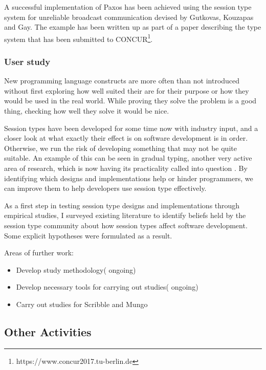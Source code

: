 A successful implementation of Paxos has been achieved using the session type system for unreliable broadcast communication devised by Gutkovas, Kouzapas and Gay. The example has been written up as part of a paper describing the type system that has been submitted to CONCUR\footnote{https://www.concur2017.tu-berlin.de}.

\subsubsection{User study}
\label{us}

New programming language constructs are more often than not introduced without first exploring how well suited their are for their purpose or how they would be used in the real world. While proving they solve the problem is a good thing, checking how well they solve it would be nice.

Session types have been developed for some time now with industry input, and a closer look at what exactly their effect is on software development is in order. Otherwise, we run the risk of developing something that may not be quite suitable. An example of this can be seen in gradual typing, another very active area of research, which is now having its practicality called into question \cite{Takikawa:2016:SGT:2837614.2837630}. By identifying which designs and implementations help or hinder programmers, we can improve them to help developers use session type effectively.


As a first step in testing session type designs and implementations through empirical studies, I surveyed existing literature to identify beliefs held by the session type community about how session types affect software development. Some explicit hypotheses were formulated as a result.\cite{Voinea:2016:BST:3001878.3001883}

Areas of further work:
\begin{itemize}
\item Develop study methodology( ongoing)
\item Develop necessary tools for carrying out studies( ongoing)
\item Carry out studies for Scribble and Mungo
\end{itemize}


\subsection{Other Activities}
\label{sec:Activities}

